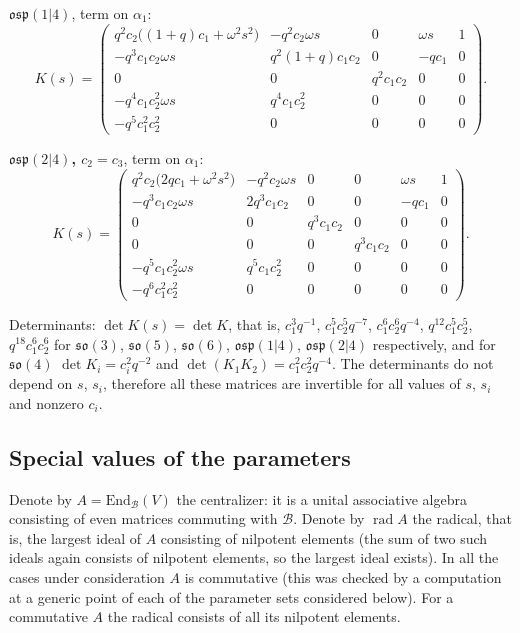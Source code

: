 \documentclass[12pt,a4paper]{article}
\newcommand{\so}{\mathfrak{so}}
\newcommand{\osp}{\mathfrak{osp}}
\begin{document}
\textbf{$\osp(1|4)$}, term on $\alpha_1$:
\[
K(s)=\begin{pmatrix}
q^{2}c_2\bigl((1+q)c_1+\omega^2s^2\bigr) & -q^{2}c_2\omega s & 0 & \omega s & 1 \\
-q^{3}c_1c_2\omega s & q^{2}(1+q)c_1c_2 & 0 & -qc_1 & 0 \\
0 & 0 & q^{2}c_1c_2 & 0 & 0 \\
-q^{4}c_1c_2^{2}\omega s & q^{4}c_1c_2^{2} & 0 & 0 & 0 \\
-q^{5}c_1^{2}c_2^{2} & 0 & 0 & 0 & 0
\end{pmatrix}.
\]

\textbf{$\osp(2|4)$, $c_2=c_3$}, term on $\alpha_1$:
\[
K(s)=\begin{pmatrix}
q^{2}c_2\bigl(2qc_1+\omega^2s^2\bigr) & -q^{2}c_2\omega s & 0 & 0 & \omega s & 1 \\
-q^{3}c_1c_2\omega s & 2q^{3}c_1c_2 & 0 & 0 & -qc_1 & 0 \\
0 & 0 & q^{3}c_1c_2 & 0 & 0 & 0 \\
0 & 0 & 0 & q^{3}c_1c_2 & 0 & 0 \\
-q^{5}c_1c_2^{2}\omega s & q^{5}c_1c_2^{2} & 0 & 0 & 0 & 0 \\
-q^{6}c_1^{2}c_2^{2} & 0 & 0 & 0 & 0 & 0
\end{pmatrix}.
\]

Determinants: $\det K(s)=\det K$, that is, $c_1^3q^{-1}$, $c_1^5c_2^5q^{-7}$, $c_1^6c_2^6q^{-4}$, $q^{12}c_1^5c_2^5$,
$q^{18}c_1^6c_2^6$ for $\so(3)$, $\so(5)$, $\so(6)$, $\osp(1|4)$, $\osp(2|4)$ respectively, and for $\so(4)$
$\det K_i=c_i^2q^{-2}$ and $\det(K_1K_2)=c_1^2c_2^2q^{-4}$. The determinants do not depend on $s$, $s_i$, therefore all these matrices are invertible for all values of $s$, $s_i$ and nonzero $c_i$.

\subsection{Special values of the parameters}\label{ss:special}
Denote by $A=\mathrm{End}_{\mathcal B}(V)$ the centralizer: it is a unital associative algebra consisting of
even matrices commuting with $\mathcal B$. Denote by $\operatorname{rad}A$ the radical, that is, the largest ideal of $A$ consisting of nilpotent elements (the sum of two such ideals again consists of nilpotent elements, so the largest ideal exists). In all the cases under consideration $A$ is commutative (this was checked
by a computation at a generic point of each of the parameter sets considered below). For a commutative $A$ the radical consists of all its nilpotent elements.
\end{document}
